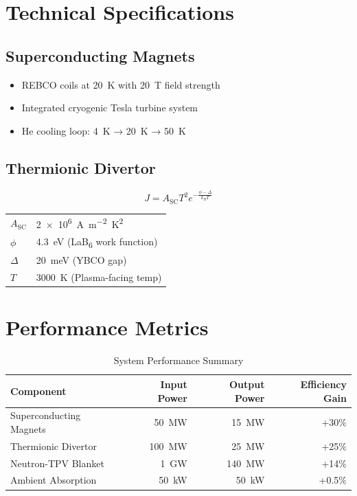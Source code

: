 \documentclass{article}
\begin{document}
\section{Technical Specifications}
\subsection{Superconducting Magnets}
\begin{itemize}
\item REBCO coils at \SI{20}{K} with \SI{20}{T} field strength
\item Integrated cryogenic Tesla turbine system
\item He cooling loop: \SI{4}{K} → \SI{20}{K} → \SI{50}{K}
\end{itemize}

\subsection{Thermionic Divertor}
\begin{equation}
J = A_{\text{SC}}T^2 e^{-\frac{\phi - \Delta}{k_B T}}
\end{equation}
\begin{tabular}{@{}ll@{}}
$A_{\text{SC}}$ & \SI{2e6}{\ampere\per\square\meter\kelvin^2} \\
$\phi$ & \SI{4.3}{\electronvolt} (LaB\textsubscript{6} work function) \\
$\Delta$ & \SI{20}{\milli\electronvolt} (YBCO gap) \\
$T$ & \SI{3000}{\kelvin} (Plasma-facing temp) \\
\end{tabular}

\section{Performance Metrics}
\begin{table}[ht]
    \centering
    \caption{System Performance Summary}
    \label{tab:performance}
    \begin{tabular}{lrrr}
    \toprule
    Component & Input Power & Output Power & Efficiency Gain \\
    \midrule
    Superconducting Magnets & \SI{50}{MW} & \SI{15}{MW} & +30\% \\
    Thermionic Divertor & \SI{100}{MW} & \SI{25}{MW} & +25\% \\
    Neutron-TPV Blanket & \SI{1}{GW} & \SI{140}{MW} & +14\% \\
    Ambient Absorption & \SI{50}{kW} & \SI{50}{kW} & +0.5\% \\
    \bottomrule
    \end{tabular}
\end{table}
\end{document}
